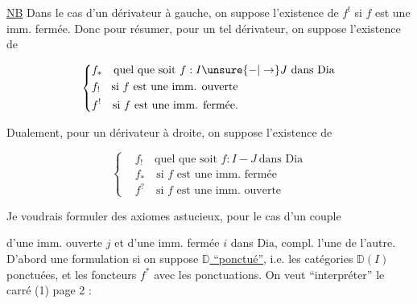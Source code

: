 
\uline{NB} Dans le cas d'un dérivateur à gauche, on suppose  l'existence de $f^{!}$ si $f$ est une imm. fermée. Donc pour résumer, pour un tel dérivateur, on suppose l'existence de

\[
\left\{\begin{aligned}
&f_{*}\quad\text{quel que soit }f:I\unsure{-|\to}J\ \text{dans }\mathrm{Dia}\\
&f_{!}\quad\text{si }f\text{ est une imm. ouverte}\\
&f^{!}\quad\text{si }f\text{ est une imm. fermée.}
\end{aligned}\right.
\]



Dualement, pour un dérivateur à droite, on suppose l'existence de

\[
\left\{\begin{aligned}
&f_{!}\quad\text{quel que soit }f:I-J\ \text{dans }\mathrm{Dia}\\
&f_{*}\quad\text{si }f\text{ est une imm. fermée}\\
&f^{?}\quad\text{si }f\text{ est une imm. ouverte}
\end{aligned}\right.
\]


Je voudrais formuler des axiomes astucieux, pour le cas d'un couple


d'une imm. ouverte $j$ et d'une imm. fermée $i$ dans $\mathrm{Dia}$, compl. l'une de l'autre. D'abord une formulation si on suppose \uline{$\mathbb D$ ``ponctué''}, i.e. les catégories $\mathbb D(I)$ ponctuées, et les foncteurs $f^{*}$  avec les ponctuations. On veut ``interpréter'' le carré (1) page 2 :

